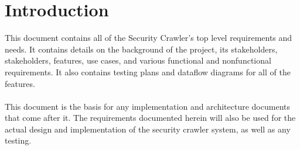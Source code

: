 \section{Introduction}
This document contains all of the Security Crawler's top level requirements and needs.  It contains details on the background of the project, its stakeholders, stakeholders, features, use cases, and various functional and nonfunctional requirements.  It also contains testing plans and dataflow diagrams for all of the features.\\\\
This document is the basis for any implementation and architecture documents that come after it.  The requirements documented herein will also be used for the actual design and implementation of the security crawler system, as well as any testing.
